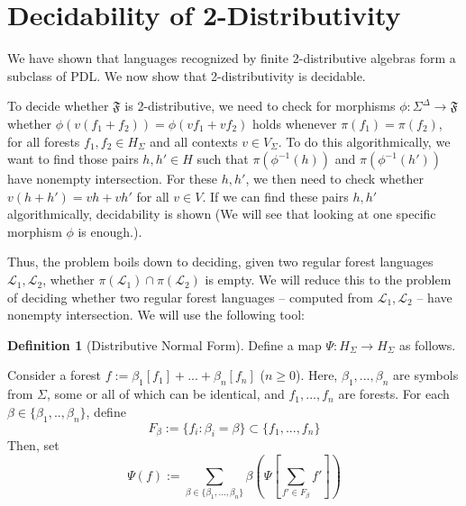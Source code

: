 \documentclass[sigplan,9pt]{acmart}\settopmatter{printfolios=true,printccs=false,printacmref=false}
\newcounter{thm}
\newcounter{theorem}
\theoremstyle{definition}
\newtheorem{defin}[thm]{Definition}
\newcommand{\La}[0]{{\mathcal{L}}}
\newcommand{\Ff}[0]{{\mathfrak{F}}}
\begin{document}
\section{Decidability of 2-Distributivity}

We have shown that languages recognized by finite 2-distributive algebras form a subclass of PDL.
We now show that 2-distributivity is decidable.


To decide whether $\Ff$ is 2-distributive, we need to check for morphisms $\phi : \Sigma^\Delta\rightarrow\Ff$ whether $\phi(v(f_1+f_2)) = \phi(vf_1 + vf_2)$ holds whenever $\pi(f_1) = \pi(f_2)$, for all forests $f_1, f_2 \in H_\Sigma$ and all contexts $v \in V_\Sigma$.
To do this algorithmically, we want to find those pairs $h, h' \in H$ such that $\pi(\phi^{-1}(h))$ and $\pi(\phi^{-1}(h'))$ have nonempty intersection. For these $h, h'$, we then need to check whether $v(h+h') = vh+vh'$ for all $v \in V$. If we can find these pairs $h, h'$ algorithmically, decidability is shown (We will see that looking at one specific morphism $\phi$ is enough.).

Thus, the problem boils down to deciding, given two regular forest languages $\La_1, \La_2$, whether $\pi(\La_1) \cap \pi(\La_2)$ is empty.
We will reduce this to the problem of deciding whether two regular forest languages -- computed from $\La_1, \La_2$ -- have nonempty intersection.
We will use the following tool: %
\begin{defin}[Distributive Normal Form]\label{def:psi}
Define a map $\Psi : H_\Sigma \rightarrow H_\Sigma$ as follows.

Consider a forest $f := \beta_1[f_1] + ... + \beta_n[f_n]$ ($n \geq 0$).
Here, $\beta_1, ..., \beta_n$ are symbols from $\Sigma$, some or all of which can be identical, and $f_1, ..., f_n$ are forests.
For each $\beta \in \{\beta_1, .., \beta_n\}$, define \[F_\beta := \{f_i : \beta_i = \beta\} \subset \{f_1, ..., f_n\}\]
Then, set $$\Psi(f) := \sum_{\beta \in \{\beta_1, ..., \beta_n\}} \beta\left(\Psi\left[\sum_{f' \in F_\beta} f'\right]\right)$$
\end{defin}
\end{document}
